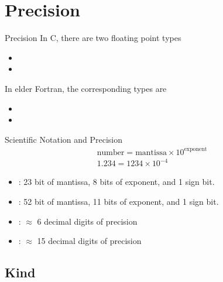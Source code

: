 \section{Precision}
\makesubcontentsslides


\begin{frame}
  \begin{block}{Precision}\pause
    In C, there are two floating point types
    \begin{itemize}
      \item {}
      \item {}
    \end{itemize}
    In elder Fortran, the corresponding types are
    \begin{itemize}
      \item {}
      \item {}
    \end{itemize}
  \end{block}
\end{frame}


\begin{frame}
  \begin{block}{Scientific Notation and Precision}\pause
\begin{align*}
\text{number} = \text{mantissa}\times 10^{\text{exponent}}\\
1.234 = 1234\times 10^{-4}
\end{align*}
    \begin{itemize}
      \item {}: 23 bit of mantissa, 8 bits of exponent, and 1 sign bit.
      \item {}: 52 bit of mantissa, 11 bits of exponent, and 1 sign bit.
    \end{itemize}
    \begin{itemize}
      \item {}: $\approx$ 6 decimal digits of precision
      \item {}: $\approx$ 15 decimal digits of precision
    \end{itemize}
  \end{block}
\end{frame}


\subsection{Kind}

